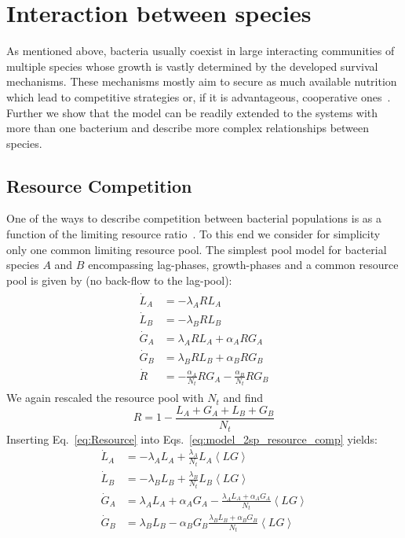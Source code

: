\documentclass[10pt,A4paper]{article}
\numberwithin{equation}{section}
\begin{document}
\section{Interaction between species}
As mentioned above, bacteria usually coexist in large interacting communities of multiple species whose growth is vastly determined by the developed survival mechanisms.
These mechanisms mostly aim to secure as much available nutrition which lead to competitive strategies or, if it is advantageous, cooperative ones~\cite{hibbing_bacterial_2010, stubbendieck_bacterial_2016}.
Further we show that the model can be readily extended to the systems with more than one bacterium and describe more complex relationships between species.
%
\subsection{Resource Competition}
One of the ways to describe competition between bacterial populations is as a function of the limiting resource ratio~\cite{tilman_resource_1977, smith_effects_2002,ghoul_ecology_2016}.
To this end we consider for simplicity only one common limiting resource pool.
The simplest pool model for bacterial species $A$ and $B$ encompassing lag-phases, growth-phases and a common resource pool is given by (no back-flow to the lag-pool):
\begin{align}
    \begin{split}
        \dot{L}_A &= - \lambda_A R L_A\\
        \dot{L}_B &= - \lambda_B R L_B \\
        \dot{G}_A &= \lambda_A R L_A +\alpha_A R G_A\\
        \dot{G}_B &= \lambda_B R L_B +\alpha_B R G_B\\
        \dot{R} &=-\frac{\alpha_A}{N_t} R G_A-\frac{\alpha_B}{N_t} R G_B
    \end{split}
    \label{eq:model_2sp_resource_comp}
\end{align}
We again rescaled the resource pool with $N_t$ and find
\begin{equation}
    R =1-\frac{L_A+G_A+L_B+G_B}{N_t}
    \label{eq:Resource}
\end{equation}
Inserting Eq.~\ref{eq:Resource} into Eqs.~\ref{eq:model_2sp_resource_comp} yields:
\begin{align}
    \dot{L}_A &= -\lambda_A  L_A + \frac{\lambda_A}{N_t}L_A\left<LG\right>\\
    \dot{L}_B &= -\lambda_B L_B + \frac{\lambda_B}{N_t}L_B \left<LG\right>\\
    \dot{G}_A &=  \lambda_A  L_A + \alpha_A G_A - \frac{\lambda_A L_A + \alpha_A G_A}{N_t} \left<LG\right>\\
    \dot{G}_B &=  \lambda_B L_B - \alpha_B G_B \frac{\lambda_B L_B + \alpha_B G_B}{N_t}\left<LG\right>
\end{align}
\end{document}
